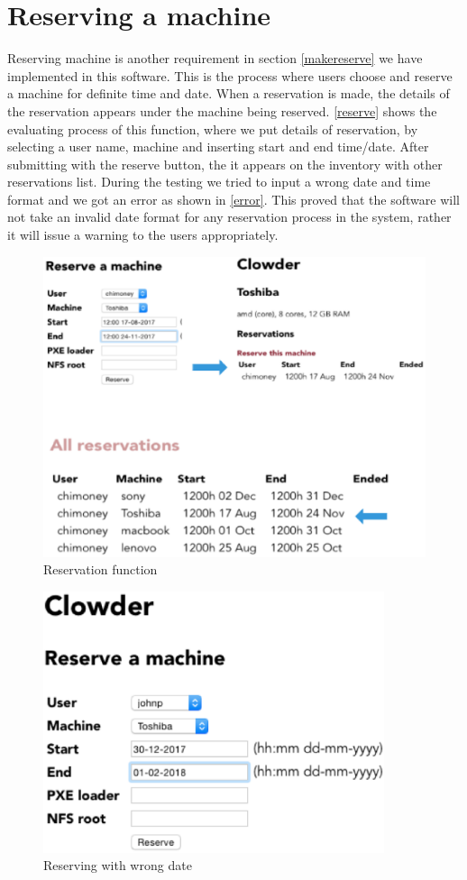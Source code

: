 \pagebreak
\section*{Reserving a machine}
Reserving machine is another requirement in section \ref{makereserve} we have implemented in this software. This is the process where users choose and reserve a machine for definite time and date. When a reservation is made, the details of the reservation appears under the machine being reserved. \autoref{reserve} shows the evaluating process of this function, where we put details of reservation, by selecting a user name, machine and inserting start and end time/date. After submitting with the reserve button, the it appears on the inventory with other reservations list. During the testing we tried to input a wrong date and time format and we got an error as shown in \autoref{error}. This proved that the software will not take an invalid date format for any reservation process in the system, rather it will issue a warning to the users appropriately.
\begin{figure}[h]
  \includegraphics[width=\linewidth]{reserve.eps}
  \caption{Reservation function}
  \label{reserve}
\end{figure}

\begin{figure}
\includegraphics[width=100mm, scale=0.5]{dateformat1.eps}
\caption{Reserving with wrong date}
\end{figure}

